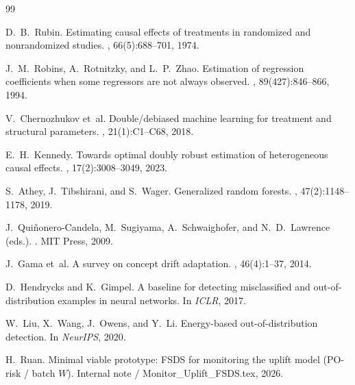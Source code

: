 \documentclass[11pt]{article}
\begin{document}
\begin{thebibliography}{99}

D.~B.~Rubin.
\newblock Estimating causal effects of treatments in randomized and
nonrandomized studies.
, 66(5):688--701, 1974.

J.~M.~Robins, A.~Rotnitzky, and L.~P.~Zhao.
\newblock Estimation of regression coefficients when some regressors are not
always observed.
, 89(427):846--866, 1994.

V.~Chernozhukov et~al.
\newblock Double/debiased machine learning for treatment and structural
parameters.
, 21(1):C1--C68, 2018.

E.~H.~Kennedy.
\newblock Towards optimal doubly robust estimation of heterogeneous causal
effects.
, 17(2):3008--3049, 2023.

S.~Athey, J.~Tibshirani, and S.~Wager.
\newblock Generalized random forests.
, 47(2):1148--1178, 2019.

J.~Qui{\~n}onero-Candela, M.~Sugiyama, A.~Schwaighofer, and N.~D.~Lawrence
(eds.).
.
\newblock MIT Press, 2009.

J.~Gama et~al.
\newblock A survey on concept drift adaptation.
, 46(4):1--37, 2014.

D.~Hendrycks and K.~Gimpel.
\newblock A baseline for detecting misclassified and out-of-distribution
examples in neural networks.
\newblock In {\em ICLR}, 2017.

W.~Liu, X.~Wang, J.~Owens, and Y.~Li.
\newblock Energy-based out-of-distribution detection.
\newblock In {\em NeurIPS}, 2020.

H.~Ruan.
\newblock Minimal viable prototype: FSDS for monitoring the uplift model
(PO-risk / batch $W$).
\newblock Internal note / {\ttfamily Monitor\_Uplift\_FSDS.tex}, 2026.

\end{thebibliography}
\end{document}
